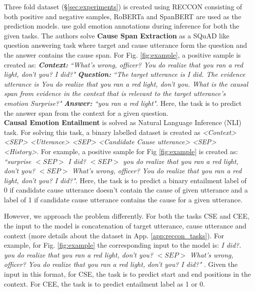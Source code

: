 \documentclass{article}
\begin{document}
Three fold dataset (\S\ref{sec:experiments}) is created using RECCON consisting of both positive and negative samples, RoBERTa \cite{liu2019roberta} and SpanBERT \cite{joshi2020spanbert} are used as the prediction models. \citet{poria2020recognizing} use gold emotion annotations during inference for both the given tasks. The authors solve \textbf{Cause Span Extraction} as a SQuAD like question answering task where target and cause utterance form the question and the answer contains the cause span. 
For Fig. \ref{fig:example}, a positive sample is created as: \textit{\textbf{Context:}} \textit{``What's wrong, officer? You do realize that you ran a red light, don't you? I did?"}
\textit{\textbf{Question:}} \textit{``The target utterance is I did. The evidence utterance is You do realize that you ran a red light, don't you. What is the causal span from evidence in the context that is relevant to the target utterance’s emotion Surprise?"}
\textit{\textbf{Answer:}} \textit{``you ran a red light"}.  Here, the task is to predict the answer span from the context for a given question.\\
\textbf{Causal Emotion Entailment} is solved as Natural Language Inference (NLI) task. For solving this task, a binary labelled dataset is created as \textit{<Context> <SEP> <Utterance> <SEP> <Candidate Cause utterance> <SEP> <History>}. For example, a positive sample for Fig \ref{fig:example} is created as: \textit{``surprise $<SEP>$ I did? $<SEP>$ you do realize that you ran a red light, don't you? $<SEP>$ What's wrong, officer? You do realize that you ran a red light, don't you? I did?"}. Here, the task is to predict a binary entailment label of 0 if candidate cause utterance doesn't contain the cause of given utterance and a label of 1 if candidate cause utterance contains the cause for a given utterance. 

However, we approach the problem differently. For both the tasks CSE and CEE, the input to the model is concatenation of target utterance, cause utterance and context (more details about the  dataset in App. \ref{app:reccon_tasks}). For example, for Fig. \ref{fig:example} the corresponding input to the model is:
\textit{I did?. you do realize that you ran a red light, don't you? $<SEP>$ What's wrong, officer? You do realize that you ran a red light, don't you? I did?" 
}. Given the input in this format, for CSE, the task is to predict start and end positions in the context. For CEE, the task is to predict entailment label as 1 or 0. 
\end{document}

